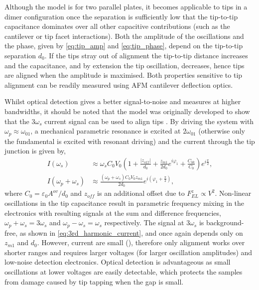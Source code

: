 \documentclass{article}
\begin{document}
Although the model is for two parallel plates, it becomes applicable to tips in a dimer configuration once the separation is sufficiently low that the tip-to-tip capacitance dominates over all other capacitive contributions (such as the cantilever or tip facet interactions). Both the amplitude of the oscillations and the phase, given by \eqref{eq:tip_amp} and \eqref{eq:tip_phase}, depend on the tip-to-tip separation $d_0$. If the tips stray out of alignment the tip-to-tip distance increases and the capacitance, and by extension the tip oscillation, decreases, hence tips are aligned when the amplitude is maximised. Both properties sensitive to tip alignment can be readily measured using AFM cantilever deflection optics.

Whilst optical detection gives a better signal-to-noise and measures at higher bandwidths, it should be noted that the model was originally developed to show that the $3\omega_s$ current signal can be used to align tips \cite{savage2011}. By driving the system with $\omega_p \approx \omega_{01}$, a mechanical parametric resonance is excited at $2\omega_{01}$ (otherwise only the fundamental is excited with resonant driving) and the current through the tip junction is given by,
\begin{subequations}
\begin{align}
I(\omega_{s}) & \approx \omega_{s}C_{0}V_{0} \left(1+\frac{|z_{off}|}{d_{0}}+\frac{z_{m1}}{2d_{0}}e^{i\varphi_1}+\frac{C_{bk}}{C_{0}}\right)e^{i\frac{\pi}{2}},\\
%
I(\omega_{p}+\omega_{s}) & \approx \frac{\left(\omega_{p}+\omega_{s}\right)C_{0}V_{0}z_{m1}}{2d_{0}} e^{i\left(\varphi_1 + \frac{\pi}{2}\right)},
\label{eq:3rd_harmonic_current}
\end{align}
\end{subequations}
where $C_0 = \varepsilon_0 A^{ov} / d_0$ and $z_{off}$ is an additional offset due to $F_{EL}^z \propto V^2$. Non-linear oscillations in the tip capacitance result in parametric frequency mixing in the electronics with resulting signals at the sum and difference frequencies, $\omega_{p}+\omega_{s}=3\omega_{s}$ and $\omega_{p}-\omega_{s}=\omega_{s}$ respectively. The signal at $3\omega_{s}$ is background-free, as shown in \eqref{eq:3rd_harmonic_current}, and once again depends only on $z_{m1}$ and $d_{0}$. However, current are small (), therefore only alignment works over shorter ranges and requires larger voltages (for larger oscillation amplitudes) and low-noise detection electronics. Optical detection is advantageous as small oscillations at lower voltages are easily detectable, which protects the samples from damage caused by tip tapping when the gap is small.
\end{document}

